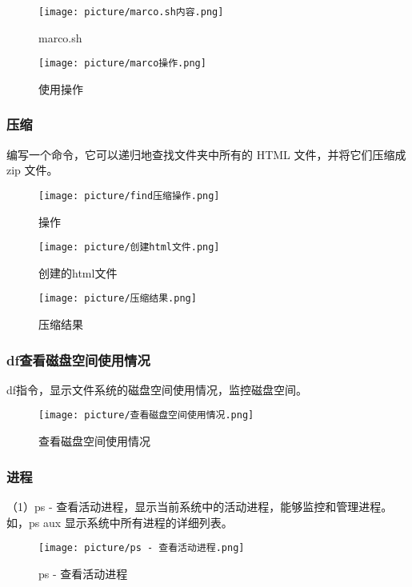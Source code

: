 \documentclass[UTF8]{ctexart}
\begin{document}
\begin{figure}[H]
    \centering
    \texttt{[image: picture/marco.sh内容.png]}
    \caption{marco.sh}
\end{figure}

\begin{figure}[H]
    \centering
    \texttt{[image: picture/marco操作.png]}
    \caption{使用操作}
\end{figure}

\subsubsection{压缩}
编写一个命令，它可以递归地查找文件夹中所有的 HTML 文件，并将它们压缩成 zip 文件。
\begin{figure}[H]
    \centering
    \texttt{[image: picture/find压缩操作.png]}
    \caption{操作}
\end{figure}

\begin{figure}[H]
    \centering
    \texttt{[image: picture/创建html文件.png]}
    \caption{创建的html文件}
\end{figure}

\begin{figure}[H]
    \centering
    \texttt{[image: picture/压缩结果.png]}
    \caption{压缩结果}
\end{figure}

\subsubsection{df查看磁盘空间使用情况}
df指令，显示文件系统的磁盘空间使用情况，监控磁盘空间。
\begin{figure}[H]
    \centering
    \texttt{[image: picture/查看磁盘空间使用情况.png]}
    \caption{查看磁盘空间使用情况}
\end{figure}

\subsubsection{进程}
（1）ps - 查看活动进程，显示当前系统中的活动进程，能够监控和管理进程。如，ps aux 显示系统中所有进程的详细列表。

\begin{figure}[H]
    \centering
    \texttt{[image: picture/ps - 查看活动进程.png]}
    \caption{ps - 查看活动进程}
\end{figure}
\end{document}
